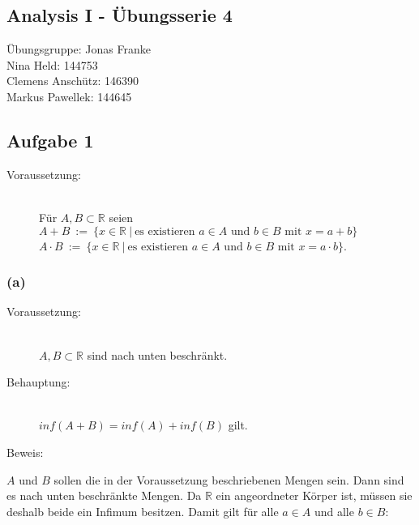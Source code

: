 \documentclass[11pt, a4paper]{article}
\begin{document}
	\begin{center} \section*{Analysis I - Übungsserie 4} \end{center}

	Übungsgruppe: Jonas Franke \\


	Nina Held: 144753 \\
	Clemens Anschütz: 146390 \\
	Markus Pawellek: 144645 \\


	\subsection*{Aufgabe 1}

		\begin{description}
			\item[Voraussetzung:] \hfill \\
				Für $A,B \subset \mathbb{R}$ seien \\
				$A+B \ := \ \{ x\in \mathbb{R} \ | \ \text{es existieren } a \in A \text{ und } b \in B \text{ mit } x = a+b \}$\\
				$A\cdot B \ := \ \{ x\in \mathbb{R} \ | \ \text{es existieren } a \in A \text{ und } b \in B \text{ mit } x = a\cdot b \}$. \hfill 
		\end{description}

	\subsubsection*{(a)}

		\begin{description}
			\item[Voraussetzung:] \hfill \\
				$A,B \subset \mathbb{R}$ sind nach unten beschränkt. \hfill 
			\item[Behauptung:] \hfill \\
				$inf(A+B) = inf(A) + inf(B)$ gilt. \hfill
			\item[Beweis:] 
		\end{description}

		$A$ und $B$ sollen die in der Voraussetzung beschriebenen Mengen sein. Dann sind es nach unten beschränkte Mengen. Da $\mathbb{R}$ ein angeordneter Körper ist, müssen sie deshalb beide ein Infimum besitzen.
		Damit gilt für alle $a \in A$ und alle $b \in B$:
\end{document}
